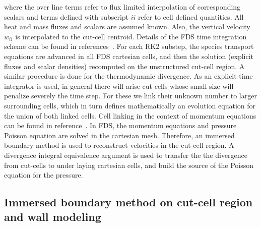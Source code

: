 \documentclass[journal,article,atmosphere,submit,moreauthors,pdftex]{Definitions/mdpi}
\begin{document}
%
where the over line terms refer to flux limited interpolation of corresponding scalars and terms defined with subscript $ii$ refer to cell defined quantities. All heat and mass fluxes and scalars are assumed known. Also, the vertical velocity $w_{ii}$ is interpolated to the cut-cell centroid. Details of the FDS time integration scheme can be found in references~\cite{mcgratta_2013,mcdermo_2014}. For each RK2 substep, the species transport equations are advanced in all FDS cartesian cells, and then the solution (explicit fluxes and scalar densities) recomputed on the unstructured cut-cell region. A similar procedure is done for the thermodynamic divergence. 
As an explicit time integrator is used, in general there will arise cut-cells whose small-size will penalize severely the time step. For these we link their unknown number to larger surrounding cells, which in turn defines mathematically an evolution equation for the union of both linked cells. Cell linking in the context of momentum equations can be found in reference~\cite{kirk_2003}.
In FDS, the momentum equations and pressure Poisson equation are solved in the cartesian mesh. Therefore, an immersed boundary method is used to reconstruct velocities in the cut-cell region. A divergence integral equivalence argument is used to transfer the the divergence from cut-cells to under laying cartesian cells, and build the source of the Poisson equation for the pressure. 


\subsection{Immersed boundary method on cut-cell region and wall modeling}
\end{document}
